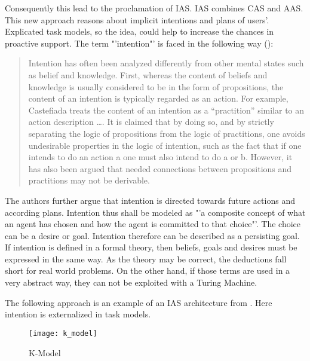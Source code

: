 Consequently this lead to the proclamation of \ac{IAS}. \ac{IAS} combines \acs{CAS} and \acs{AAS}. This new approach reasons about implicit intentions and plans of users'. Explicated task models, so the idea, could help to increase the chances in proactive support. The term "'intention"' is  faced in the following way (\cite{cohen1990intention}):
\begin{quotation}
Intention has often been analyzed differently from other mental states such as belief and knowledge. First, whereas the content of beliefs and knowledge is usually considered to be in the form of propositions, the content of an intention is typically regarded as an action. For example, Castefiada treats the content of an intention as a "`practition"' similar to an action description \dots. It is claimed that by doing so, and by strictly separating the logic of propositions from the logic of practitions, one avoids undesirable properties in the logic of intention, such as the fact that if one intends to do an action a one must also intend to do a or b. However, it has also been argued that needed connections between propositions and practitions may not be derivable.
\end{quotation}
The authors further argue that intention is directed towards future actions and according plans. Intention thus shall be modeled as "'a composite concept of what an agent has chosen and how the agent is committed to that choice"'. The choice can be a desire or goal. Intention therefore can be described as a persisting goal. If intention is defined in a formal theory, then beliefs, goals and desires must be expressed in the same way. As the theory may be correct, the deductions fall short for real world problems. On the other hand, if those terms are used in a very abstract way, they can not be exploited with a Turing Machine. 

The following approach is an example of an \ac{IAS} architecture from \cite{schmidt2011task}. Here intention is externalized in task models. 

\begin{figure}[ht]
	\centering
  \texttt{[image: k\_model]}
	\caption{K-Model}
	\label{fig3}
\end{figure}


